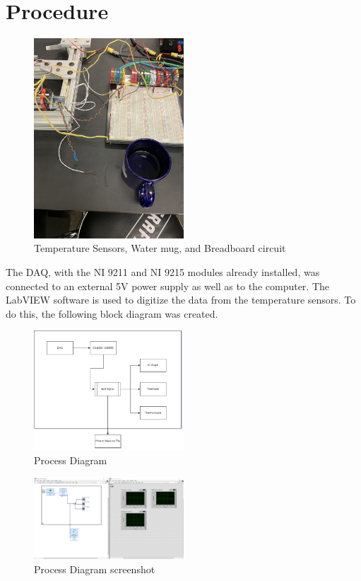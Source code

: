 \documentclass{article}
\begin{document}
\section{Procedure}
\begin{figure}[H]
\centering
\includegraphics[width=0.5\textwidth, angle = -90]{lab2images/circuit_board_mug_and_sensors.jpg}
\caption{Temperature Sensors, Water mug, and Breadboard circuit}
\end{figure}

The DAQ, with the NI 9211 and NI 9215 modules already installed, was connected to an external 5V power supply as well as to the computer.  The LabVIEW software is used to digitize the data from the temperature sensors.  To do this, the following block diagram was created.

\begin{figure}[H]
\centering
\includegraphics[width=0.5\textwidth]{lab2images/ProcessDiagram.png}
\caption{Process Diagram}
\end{figure}

\begin{figure}[H]
    \centering
    \includegraphics[width=0.5\textwidth]{lab2images/68154.jpg}
    \caption{Process Diagram screenshot}
    \end{figure}
\end{document}
